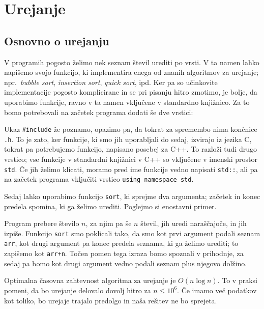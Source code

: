 \documentclass{book}
\begin{document}
\chapter{Urejanje}

\section{Osnovno o urejanju}

V programih pogosto želimo nek seznam števil urediti po vrsti.
V ta namen lahko napišemo svojo funkcijo, ki implementira enega od znanih
algoritmov za urejanje; npr.~\textit{bubble sort}, \textit{insertion sort},
\textit{quick sort}, ipd. Ker pa so učinkovite implementacije pogosto komplicirane
in se pri pisanju hitro zmotimo, je bolje, da uporabimo funkcije, ravno v ta
namen vključene v standardno knjižnico. Za to bomo potrebovali na začetek
programa dodati še dve vrstici:


Ukaz \verb+#include+ že poznamo, opazimo pa, da tokrat za spremembo nima končnice
\verb+.h+. To je zato, ker funkcije, ki smo jih uporabljali do sedaj, izvirajo
iz jezika C, tokrat pa potrebujemo funkcijo, napisano posebej za C++. To razloži
tudi drugo vrstico; vse funkcije v standardni knjižnici v C++ so vključene
v imenski prostor \verb+std+. Če jih želimo klicati, moramo pred ime funkcije
vedno napisati \verb+std::+, ali pa na začetek programa vključiti vrstico
\verb+using namespace std+.

Sedaj lahko uporabimo funkcijo \verb+sort+, ki sprejme dva argumenta;
začetek in konec predela spomina, ki ga želimo urediti. Poglejmo si enostavni
primer.



Program prebere število \(n\), za njim pa še \(n\) števil, jih uredi naraščajoče,
in jih izpiše. Funkcijo \verb+sort+ smo poklicali tako, da smo kot prvi argument
podali seznam \verb+arr+, kot drugi argument pa konec predela seznama, ki ga
želimo urediti; to zapišemo kot \verb|arr+n|. Točen pomen tega izraza bomo
spoznali v prihodnje, za sedaj pa bomo kot drugi argument vedno podali seznam
plus njegovo dolžino.

Optimalna časovna zahtevnost algoritma za urejanje je \(O(n \log n)\). To v praksi
pomeni, da bo urejanje delovalo dovolj hitro za \(n \le 10^6\). Če imamo več
podatkov kot toliko, bo urejaje trajalo predolgo in naša rešitev ne bo sprejeta.
\end{document}
